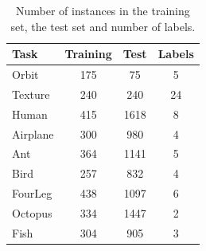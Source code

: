 \begin{table}[t]
\vskip 0.15in
\begin{center}
\begin{small}
\begin{sc}
\begin{tabular}{|l|c|c|c|}
\hline
 Task &        Training &                               Test &                       Labels \\
\hline
Orbit &        175 &                                    75 &                         5  \\
Texture &      240 &                                    240 &                        24  \\
Human &        415 &                                    1618 &                       8 \\
Airplane &     300 &                                    980 &                        4 \\
Ant &          364 &                                    1141 &                       5 \\
Bird &         257 &                                    832 &                        4 \\
FourLeg &      438 &                                    1097 &                       6 \\
Octopus &      334 &                                    1447 &                       2 \\
Fish &         304 &                                    905 &                        3 \\
\hline          
\end{tabular}
\end{sc}
\end{small}
\caption{\label{table:sum} Number of instances in the training set, the test set and number of labels.}
\end{center}
\vskip -0.1in
\end{table}

